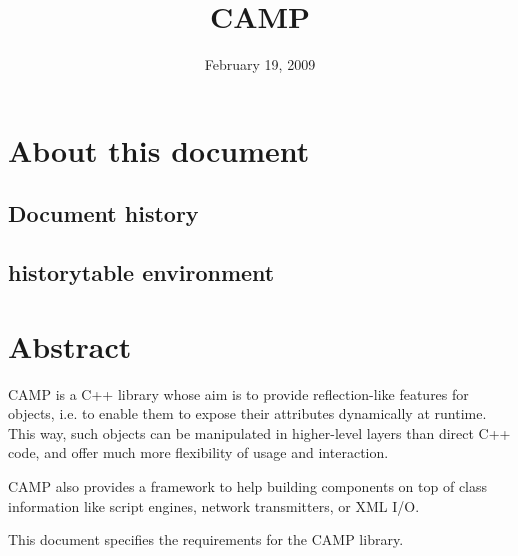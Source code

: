 \documentclass[a4paper, twoside]{report}
\title{CAMP}
\date{February 19, 2009}
\begin{document}
\maketitle

\chapter*{About this document}

\section*{Document history}

\begin{historytable}
\end{historytable}



\tableofcontents

\section{historytable environment}
\begin{historytable}
\end{historytable}

\chapter{Abstract}

	CAMP is a C++ library whose aim is to provide reflection-like features for
	objects, i.e. to enable them to expose their attributes dynamically at runtime.
	This way, such objects can be manipulated in higher-level layers than direct 
	C++ code, and offer much more flexibility of usage and interaction.
	
	CAMP also provides a framework to help building components on top of class information
	like script engines, network transmitters, or XML I/O.
	
	This document specifies the requirements for the CAMP library.
\end{document}
